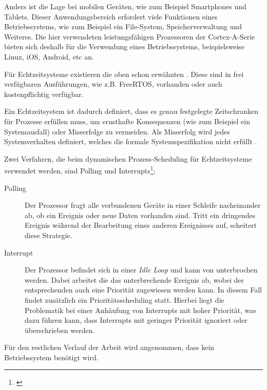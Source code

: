 	Anders ist die Lage bei mobilen Geräten, wie zum Beispiel Smartphones und Tablets. Dieser Anwendungsbereich
	erfordert viele Funktionen eines Betriebssystems, wie zum Beispiel ein File-System, Speicherverwaltung und Weiteres.
	Die hier verwendeten leistungsfähigen Prozessoren der Cortex-A-Serie bieten sich deshalb für
	die Verwendung eines Betriebssystems, beispielsweise Linux, iOS, Android, etc an.

	Für Echtzeitsysteme existieren die oben schon erwähnten . Diese sind in frei
	verfügbaren Ausführungen, wie z.B. FreeRTOS, vorhanden oder auch kostenpflichtig verfügbar.

	Ein Echtzeitsystem ist dadurch definiert, dass es genau festgelegte Zeitschranken für Prozesse erfüllen muss, um
	ernsthafte Konsequenzen (wie zum Beispiel ein Systemausfall) oder Misserfolge zu vermeiden. Als Misserfolg wird
	jedes Systemverhalten definiert, welches die formale Systemspezifikation nicht erfüllt
	\citep[vgl.~Kap.~2.2.5]{Brause2017}.

    Zwei Verfahren, die beim dynamischen Prozess-Scheduling für Echtzeitsysteme verwendet werden, sind Polling und
    Interrupts\footnote{\citep[vgl.~Kap.~2.2.5]{Brause2017}}:
    \begin{description}
        \item[Polling] Der Prozessor fragt alle verbundenen Geräte in einer Schleife nacheinander ab, ob ein Ereignis
        oder neue Daten vorhanden sind. Tritt ein dringendes Ereignis während der Bearbeitung eines anderen Ereignisses
        auf, scheitert diese Strategie.
        \item[Interrupt] Der Prozessor befindet sich in einer \textit{Idle Loop} und kann von
         unterbrochen werden. Dabei arbeitet die  das
        unterbrechende Ereignis ab, wobei der entsprechenden  auch eine Priorität zugewiesen werden kann. In diesem
        Fall findet zusätzlich ein Prioritätsscheduling statt. Hierbei liegt die Problematik bei einer Anhäufung von
        Interrupts mit hoher Priorität, was dazu führen kann, dass Interrupts mit geringer Priorität ignoriert oder
        überschrieben werden.
    \end{description}

    Für den restlichen Verlauf der Arbeit wird angenommen, dass kein Betriebssystem benötigt wird.

